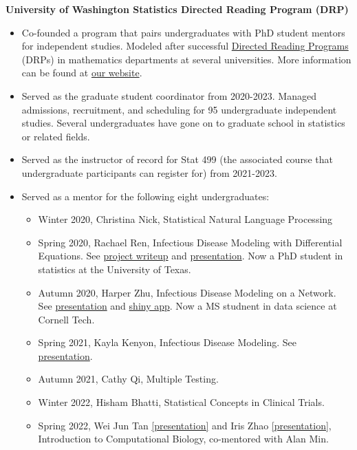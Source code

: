 \documentclass[margin, 10pt]{res}
\begin{document}
\begin{resume}
{\textbf{University of Washington Statistics Directed Reading Program (DRP)}}
\begin{itemize}
  \item Co-founded a program that pairs undergraduates with PhD student mentors for independent studies. Modeled after successful \href{https://sites.google.com/view/drp-network/}{Directed Reading Programs} (DRPs) in mathematics departments at several universities. More information can be found at \href{https://spa-drp.github.io}{our website}. 
  \item Served as the graduate student coordinator from 2020-2023. Managed admissions, recruitment, and scheduling for 95 undergraduate independent studies. Several undergraduates have gone on to graduate school in statistics or related fields. 
  \item Served as the instructor of record for Stat 499 (the associated course that undergraduate participants can register for) from 2021-2023. 
  \item Served as a mentor for the following eight undergraduates:
  \begin{itemize}
  \item Winter 2020, Christina Nick, Statistical Natural Language Processing
  \item Spring 2020, Rachael Ren, Infectious Disease Modeling with Differential Equations. See \href{https://spa-drp.github.io/writeups/spring2020/rachael.pdf}{project writeup} and \href{https://spa-drp.github.io/writeups/spring2020/rachaelslides.pdf}{presentation}. Now a PhD student in statistics at the University of Texas. 
  \item Autumn 2020, Harper Zhu, Infectious Disease Modeling on a Network.  See \href{https://spa-drp.github.io/writeups/aut2020/harper-slides.pdf}{presentation} and \href{https://harperzhu.shinyapps.io/DiseaseSimulation/}{shiny app}. Now a MS studnent in data science at Cornell Tech. 
  \item Spring 2021, Kayla Kenyon, Infectious Disease Modeling. See \href{https://spa-drp.github.io//writeups/spring2021/kayla_slides.pdf}{presentation}. 
  \item Autumn 2021, Cathy Qi, Multiple Testing. 
  \item Winter 2022, Hisham Bhatti, Statistical Concepts in Clinical Trials.
 \item Spring 2022, Wei Jun Tan \href{https://spa-drp.github.io/writeups/spring2022/slides/weijun.pdf}{[presentation]} and Iris Zhao \href{https://spa-drp.github.io//writeups/spring2022/slides/iris.pdf}{[presentation]}, Introduction to Computational Biology, co-mentored with Alan Min.  
 \end{itemize}
 \end{itemize}


\end{resume}
\end{document}
